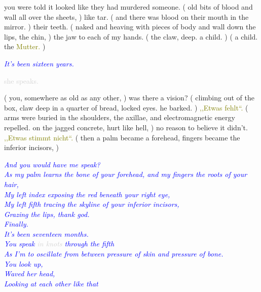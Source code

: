 \documentclass[11pt]{article}
\begin{document}
\begingroup
you were told it looked like they had murdered someone. ( old bits of blood and wall all over the sheets, ) like tar. ( and there was blood on their mouth in the mirror. ) their teeth. ( naked and heaving with pieces of body and wall down the lips, the chin, ) the jaw to each of my hands. ( the claw, deep.  a child. ) ( a child. the \textcolor{olive}{Mutter.} )
\endgroup

\begingroup
\begin{center}
\textit{\textcolor{blue}{It's been sixteen years.}}
\end{center}
\endgroup

\begingroup
\begin{center}
\textcolor{lightgray}{she speaks.}
\rightskip\leftskip
\end{center}
\endgroup

\begingroup
( you, somewhere as old as any other, ) was there a vision? ( climbing out of the box, claw deep in a quarter of bread, locked eyes. he barked. ) \textcolor{olive}{,,Etwas fehlt“.} ( arms were buried in the shoulders, the axillae, and electromagnetic energy repelled. on the jagged concrete, hurt like hell, ) no reason to believe it didn't. \textcolor{olive}{,,Etwas stimmt nicht“.} ( then a palm became a forehead, fingers became the inferior incisors, )
\endgroup

\begingroup
\begin{center}
\textit{\textcolor{blue}{And you would have me speak? \\ As my palm learns the bone of your forehead, and my fingers the roots of your hair, \\ My left index exposing the red beneath your right eye, \\ My left fifth tracing the skyline of your inferior incisors, \\ Grazing the lips, thank god. \\ Finally. \\ It's been seventeen months. \\ You speak} \textcolor{lightgray}{in knots} \textcolor{blue}{through the fifth \\ As I'm to oscillate from between pressure of skin and pressure of bone. \\ You look up, \\ Waved her head, \\ Looking at each other like that } }
\end{center}
\endgroup
\end{document}
